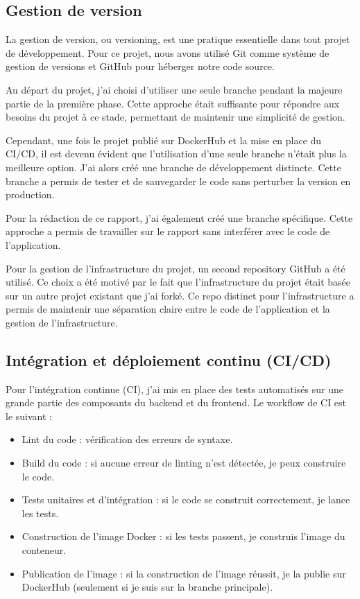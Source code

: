 \subsection{Gestion de version}\label{subsec:gestion-de-version}

La gestion de version, ou versioning, est une pratique essentielle dans tout projet de développement.
Pour ce projet, nous avons utilisé Git comme système de gestion de versions et GitHub pour héberger notre code source.

Au départ du projet, j'ai choisi d'utiliser une seule branche pendant la majeure partie de la première phase.
Cette approche était suffisante pour répondre aux besoins du projet à ce stade, permettant de maintenir une simplicité de gestion.

Cependant, une fois le projet publié sur DockerHub et la mise en place du CI/CD, il est devenu évident que l'utilisation d'une seule branche n'était plus la meilleure option.
J'ai alors créé une branche de développement distincte.
Cette branche a permis de tester et de sauvegarder le code sans perturber la version en production.

Pour la rédaction de ce rapport, j'ai également créé une branche spécifique.
Cette approche a permis de travailler sur le rapport sans interférer avec le code de l'application.

Pour la gestion de l'infrastructure du projet, un second repository GitHub a été utilisé.
Ce choix a été motivé par le fait que l'infrastructure du projet était basée sur un autre projet existant que j'ai forké.
Ce repo distinct pour l'infrastructure a permis de maintenir une séparation claire entre le code de l'application et la gestion de l'infrastructure.

\subsection{Intégration et déploiement continu (CI/CD)}\label{subsec:integration-et-deploiement-continu-(ci/cd)}

Pour l'intégration continue (CI), j'ai mis en place des tests automatisés sur une grande partie des composants du backend et du frontend.
Le workflow de CI est le suivant :

\begin{itemize}
    \item Lint du code : vérification des erreurs de syntaxe.
    \item Build du code : si aucune erreur de linting n'est détectée, je peux construire le code.
    \item Tests unitaires et d'intégration : si le code se construit correctement, je lance les tests.
    \item Construction de l'image Docker : si les tests passent, je construis l'image du conteneur.
    \item Publication de l'image : si la construction de l'image réussit, je la publie sur DockerHub (seulement si je suis sur la branche principale).
\end{itemize}

